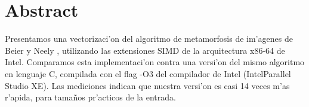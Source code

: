 \section{Abstract}

Presentamos una vectorizaci'on del algoritmo de metamorfosis de im'agenes de Beier y Neely \cite{beier92}, utilizando las extensiones SIMD de la arquitectura x86-64 de Intel. Comparamos esta implementaci'on contra una versi'on del mismo algoritmo en lenguaje C, compilada con el flag -O3 del compilador de Intel (Intel\textregistered Parallel Studio XE). Las mediciones indican que nuestra versi'on es casi 14 veces m'as r'apida, para tama\~{n}os pr'acticos de la entrada.
